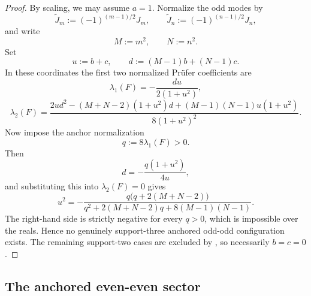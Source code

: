 \documentclass[11pt,reqno]{amsart}
\theoremstyle{definition}
\begin{document}
\begin{proof}
By scaling, we may assume $a=1$. Normalize the odd modes by
\[
\widetilde J_m:=(-1)^{(m-1)/2}J_m,
\qquad
\widetilde J_n:=(-1)^{(n-1)/2}J_n,
\]
and write
\[
M:=m^2,
\qquad
N:=n^2.
\]
Set
\[
u:=b+c,
\qquad
d:=(M-1)b+(N-1)c.
\]
In these coordinates the first two normalized Pr\"ufer coefficients are
\[
\lambda_1(F)=-\frac{du}{2(1+u^2)},
\]
\[
\lambda_2(F)=
\frac{2ud^2-(M+N-2)(1+u^2)d+(M-1)(N-1)u(1+u^2)}
{8(1+u^2)^2}.
\]
Now impose the anchor normalization
\[
q:=8\lambda_1(F)>0.
\]
Then
\[
d=-\frac{q(1+u^2)}{4u},
\]
and substituting this into $\lambda_2(F)=0$ gives
\[
u^2
=
-\frac{q\bigl(q+2(M+N-2)\bigr)}
{q^2+2(M+N-2)q+8(M-1)(N-1)}.
\]
The right-hand side is strictly negative for every $q>0$, which is impossible over the reals.
Hence no genuinely support-three anchored odd-odd configuration exists. The remaining
support-two cases are excluded by , so necessarily $b=c=0$.
\end{proof}

\subsection*{The anchored even-even sector}
\end{document}
